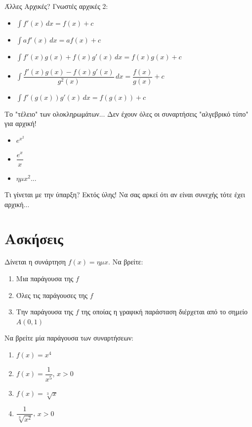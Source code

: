 \documentclass{presentation}
\begin{document}
\begin{frame}{Άλλες Αρχικές?}
  Γνωστές αρχικές 2:
  \begin{itemize}[<+->]
    \item $\int f'(x) \, dx=f(x)+c$
    \item $\int af'(x) \, dx=af(x)+c$
    \item $\int f'(x)g(x)+f(x)g'(x) \, dx=f(x)g(x)+c$
    \item $\int \dfrac{f'(x)g(x)-f(x)g'(x)}{g^2(x)} \, dx=\dfrac{f(x)}{g(x)}+c$
    \item $\int f'(g(x))g'(x) \, dx=f(g(x))+c$
  \end{itemize}
\end{frame}

\begin{frame}{Το "τέλειο" των ολοκληρωμάτων...}
  Δεν έχουν όλες οι συναρτήσεις "αλγεβρικό τύπο" για αρχική!
  \begin{itemize}[<+->]
    \item $e^{x^2}$
    \item $\dfrac{e^x}{x}$
    \item $ημx^2$...
  \end{itemize}
\end{frame}

\begin{frame}{Τι γίνεται με την ύπαρξη?}
  Εκτός ύλης! Να σας αρκεί ότι αν είναι συνεχής τότε έχει αρχική...
  \newline
\end{frame}


\section{Ασκήσεις}

\exercises

\begin{askisi}
  Δίνεται η συνάρτηση $f(x)=ημx$. Να βρείτε:
  \begin{enumerate}[<+->]
    \item Μια παράγουσα της $f$
    \item Όλες τις παράγουσες της $f$
    \item Την παράγουσα της $f$ της οποίας η γραφική παράσταση διέρχεται από το σημείο $A(0,1)$
  \end{enumerate}
\end{askisi}

\begin{askisi}
  Να βρείτε μία παράγουσα των συναρτήσεων:
  \begin{enumerate}[<+->]
    \item $f(x)=x^4$
    \item $f(x)=\dfrac{1}{x^5}$, $x>0$
    \item $f(x)=\sqrt[3]{x}$
    \item $\dfrac{1}{\sqrt[3]{x^2}}$, $x>0$
  \end{enumerate}
\end{askisi}
\end{document}
